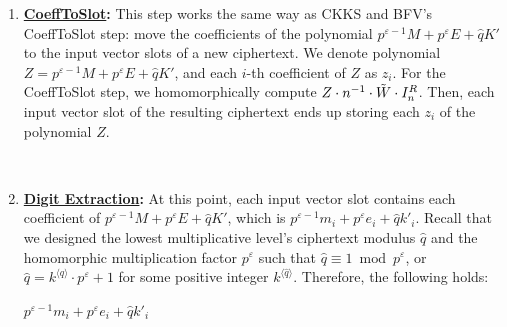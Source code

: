 \begin{enumerate}
$ $

Note that $K'\hat{q}$ is the $\hat{q}$-multiple overflow and does not get reduced modulo $q_L$, because $K'\hat{q} \ll q_L$. We saw the same situation in the CKKS bootstrapping's \textsf{ModRaise} (\autoref{subsubsec:ckks-bootstrapping-high-level}) which resets the ciphertext modulus from $q_0 \rightarrow q_L$ at the cost of incurring a $Kq_0$ overflow, which is to be removed by \textsf{EvalExp}'s homomorphic (approximate) sine graph evaluation (\autoref{subsubsec:ckks-bootstrapping-evalexp-details}). Likewise, BGV's mod-raised ciphertext $(\hat{A}, \hat{B}) \bmod q_L$ is $\textsf{RLWE}_{S, \sigma}(p^{\varepsilon-1}M + p^\varepsilon E + K'\hat{q}) \bmod q_L$, an encryption of $p^{\varepsilon-1}M + p^\varepsilon E + K'\hat{q}$. In the later step, we will use digit extraction to homomorphically eliminate $K'\hat{q}$ like we did in BFV's bootstrapping. The reason BGV's bootstrapping uses digit extraction instead of approximated sine evaluation is that BGV is an exact encryption scheme like BFV (not an approximate scheme like CKKS). 

$ $

\item \textbf{\textsf{\underline{CoeffToSlot}}:} This step works the same way as CKKS and BFV's \textsf{CoeffToSlot} step: move the coefficients of the polynomial $p^{\varepsilon-1} M + p^\varepsilon E + \hat{q}K'$ to the input vector slots of a new ciphertext. We denote polynomial $Z = p^{\varepsilon-1} M + p^\varepsilon E + \hat{q}K'$, and each $i$-th coefficient of $Z$ as $z_i$. For the \textsf{CoeffToSlot} step, we homomorphically compute $Z \cdot n^{-1} \cdot \tilde W \cdot I_n^R$. Then, each input vector slot of the resulting ciphertext ends up storing each $z_i$ of the polynomial $Z$. 

$ $

\item \textbf{\underline{Digit Extraction}:} At this point, each input vector slot contains each coefficient of $p^{\varepsilon-1} M + p^\varepsilon E + \hat{q}K'$, which is $p^{\varepsilon-1} m_i + p^\varepsilon e_i + \hat{q}k'_i$. Recall that we designed the lowest multiplicative level's ciphertext modulus $\hat{q}$ and the homomorphic multiplication factor $p^\varepsilon$ such that $\hat{q} \equiv 1 \bmod p^\varepsilon$, or $\hat{q} = k^{\langle \hat{q} \rangle } \cdot p^\varepsilon + 1$ for some positive integer $k^{\langle \hat{q} \rangle }$. Therefore, the following holds: 

$p^{\varepsilon-1} m_i + p^\varepsilon e_i + \hat{q}k'_i$


\end{enumerate}
